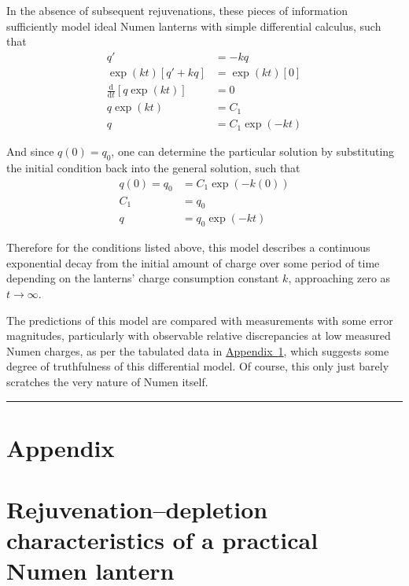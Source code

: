 \documentclass[11pt,a4paper]{article}
\newcommand{\sectionbreak}{
	\par\bigskip
	\noindent\rule{\linewidth}{0.4pt}
	\par\bigskip
}
\begin{document}
	In the absence of subsequent rejuvenations, these pieces of information sufficiently model ideal Numen lanterns with simple differential calculus, such that
	\begin{equation}
	\begin{aligned}
		q' &= -kq \\
		\exp(kt)[q' + kq] &= \exp(kt)[0] \\
		\frac{\mathrm{d}}{\mathrm{d}t}[q\exp(kt)] &= 0 \\
		q\exp(kt) &= C_1 \\
		q &= C_1\exp(-kt)
	\end{aligned}
	\end{equation}
	
	And since \(q(0) = q_0\), one can determine the particular solution by substituting the initial condition back into the general solution, such that
	\begin{equation}
	\begin{aligned}
		q(0) = q_0 &= C_1\exp(-k(0)) \\
		C_1 &= q_0 \\
		q &= q_0\exp(-kt)
	\end{aligned}
	\end{equation}
	
	Therefore for the conditions listed above, this model describes a continuous exponential decay from the initial amount of charge over some period of time depending on the lanterns' charge consumption constant \(k\), approaching zero as \(t \to \infty\).
	
	The predictions of this model are compared with measurements with some error magnitudes, particularly with observable relative discrepancies at low measured Numen charges, as per the tabulated data in \hyperref[app:lantern]{Appendix~\ref*{app:lantern}}, which suggests some degree of truthfulness of this differential model. Of course, this only just barely scratches the very nature of Numen itself.
	
	\sectionbreak
	
	\appendix
	
	\section*{Appendix}
	
	\section{Rejuvenation--depletion characteristics of a practical Numen lantern}
	\label{app:lantern}
	
\end{document}
